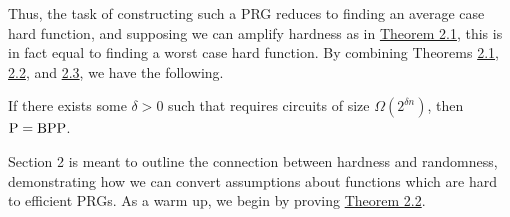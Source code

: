\documentclass[11pt]{article}
\begin{document}
Thus, the task of constructing such a PRG reduces to finding an average case hard function, and supposing we can amplify hardness as in \hyperref[t-2-1]{Theorem 2.1}, this is in fact equal to finding a worst case hard function. By combining Theorems \hyperref[t-2-1]{2.1}, \hyperref[t-2-2]{2.2}, and \hyperref[t-2-3]{2.3}, we have the following.

\begin{corollary}{2.1}
    If there exists some $\delta > 0$ such that \SAT{} requires circuits of size $\Omega(2^{\delta n})$, then $\mathrm{P} = \mathrm{BPP}$.
\end{corollary}

Section 2 is meant to outline the connection between hardness and randomness, demonstrating how we can convert assumptions about functions which are hard to efficient PRGs. As a warm up, we begin by proving \hyperref[t-2-2]{Theorem 2.2}.
\end{document}
